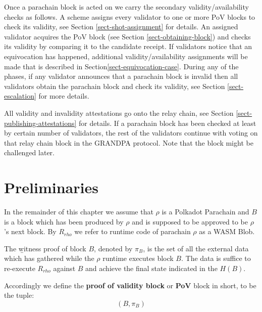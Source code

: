 Once a parachain block is acted on we carry the secondary validity/availability checks as follows. A scheme assigns every validator to one or more PoV blocks to check its validity, see Section \ref{sect-shot-assignment} for details. An assigned validator acquires the PoV block (see Section \ref{sect-obtaining-block}) and checks its validity by comparing it to the candidate receipt. If validators notice that an equivocation has happened, additional validity/availability assignments will be made that is described in Section\ref{sect-equivocation-case}. 
During any of the phases, if any validator announces that a parachain block is invalid then all validators obtain the parachain block and check its validity, see Section \ref{sect-escalation} for more details. 

All validity and invalidity attestations go onto the relay chain, see Section \ref{sect-publishing-attestations} for details. If a parachain block has been checked at least by certain number of validators, the rest of the validators continue with voting on that relay chain block in the GRANDPA protocol. Note that the block might be challenged later. 
	 
\section{Preliminaries}

\begin{definition}
In the remainder of this chapter we assume that $\rho$ is a Polkadot Parachain and $B$ is a block which has been produced by $\rho$ and is supposed to be approved to be $\rho$'s next block. By $R_{rho}$ we refer to runtime code of parachain $\rho$  as a WASM Blob. 
\end{definition}

\begin{definition}
  \label{defn-witness-proof}
  The {\b witness proof} of block $B$, denoted by {\bf $\pi_B$}, is the set of all the external data which has gathered while the $\rho$ runtime executes block $B$. The data is suffice to re-execute $R_{rho}$ against $B$ and achieve the final state indicated in the $H(B)$.
\end{definition}

\begin{definition}
  \label{defn-pov-block}
  Accordingly we define the {\bf proof of validity block} or {\bf PoV} block in short, %
  to be the tuple:
  \[
  (B, \pi_B)
  \]
\end{definition}

